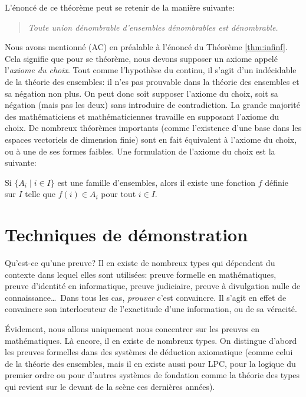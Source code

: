 \documentclass[french,course,oneside,theoremnosection]{lecture}
\begin{document}
L'énoncé de ce théorème peut se retenir de la manière suivante:
\begin{quotation}
\emph{Toute union dénombrable d'ensembles dénombrables est dénombrable.}
\end{quotation}

Nous avons mentionné (AC) en préalable à l'énoncé du Théorème \ref{thm:infinf}. Cela signifie que pour se théorème, nous devons supposer un axiome appelé l'\emph{axiome du choix}. Tout comme l'hypothèse du continu, il s'agit d'un indécidable de la théorie des ensembles: il n'es pas prouvable dans la théorie des ensembles et sa négation non plus. On peut donc soit supposer l'axiome du choix, soit sa négation (mais pas les deux) sans introduire de contradiction. La grande majorité des mathématiciens et mathématiciennes travaille en supposant l'axiome du choix. De nombreux théorèmes importants (comme l'existence d'une base dans les espaces vectoriels de dimension finie) sont en fait équivalent à l'axiome du choix, ou à une de ses formes faibles. Une formulation de l'axiome du choix est la suivante:
\begin{center}
Si $\{A_i \mid i \in I\}$ est une famille d'ensembles, alors il existe une fonction $f$ définie sur $I$ telle que $f(i)\in A_i$ pour tout $i\in I$.
\end{center}

\newpage

\section{Techniques de démonstration}

Qu'est-ce qu'une preuve? Il en existe de nombreux types qui dépendent du contexte dans lequel elles sont utilisées: preuve formelle en mathématiques, preuve d'identité en informatique, preuve judiciaire, preuve à divulgation nulle de connaissance\ldots~Dans tous les cas, \emph{prouver} c'est convaincre. Il s'agit en effet de convaincre son interlocuteur de l'exactitude d'une information, ou de sa véracité.

Évidement, nous allons uniquement nous concentrer sur les preuves en mathématiques. Là encore, il en existe de nombreux types. On distingue d'abord les preuves formelles dans des systèmes de déduction axiomatique (comme celui de la théorie des ensembles, mais il en existe aussi pour LPC, pour la logique du premier ordre ou pour d'autres systèmes de fondation comme la théorie des types qui revient sur le devant de la scène ces dernières années).
\end{document}
